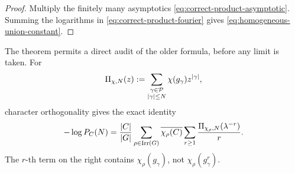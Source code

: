 \begin{proof}
Multiply the finitely many asymptotics
\eqref{eq:correct-product-asymptotic}.  Summing the logarithms in
\eqref{eq:correct-product-fourier} gives
\eqref{eq:homogeneous-union-constant}.
\end{proof}

The theorem permits a direct audit of the older formula, before any limit is
taken.  For
\[
  \Pi_{\chi,N}(z):=
  \sum_{\substack{\gamma\in\mathcal P\\|\gamma|\leq N}}
     \chi(g_\gamma)z^{|\gamma|},
\]
character orthogonality gives the exact identity
\begin{equation}\label{eq:exact-truncated-product-identity}
  -\log P_C(N)=\frac{|C|}{|G|}
  \sum_{\rho\in\operatorname{Irr}(G)}\overline{\chi_\rho(C)}
    \sum_{r\geq1}\frac{\Pi_{\chi_\rho,N}(\lambda^{-r})}{r}.
\end{equation}
The \(r\)-th term on the right contains \(\chi_\rho(g_\gamma)\), not
\(\chi_\rho(g_\gamma^r)\).

